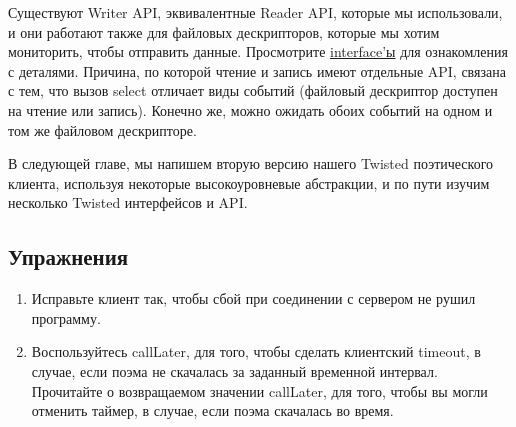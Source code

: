 Существуют Writer API, эквивалентные Reader API, которые 
мы использовали, и они работают также для файловых дескрипторов, 
которые мы хотим мониторить, чтобы отправить данные. Просмотрите  
\href{http://twistedmatrix.com/trac/browser/tags/releases/twisted-8.2.0/twisted/internet/interfaces.py}{interface'ы} 
для ознакомления с деталями. Причина, по которой чтение и запись 
имеют отдельные API, связана с тем, что вызов select 
отличает виды событий (файловый дескриптор доступен на 
чтение или запись). Конечно же, можно ожидать обоих событий 
на одном и том же файловом дескрипторе. 



В следующей главе, мы напишем вторую версию нашего Twisted 
поэтического клиента, используя некоторые высокоуровневые 
абстракции, и по пути изучим несколько Twisted интерфейсов и 
API. 


\subsection{Упражнения}

\begin{enumerate}

\item Исправьте клиент так, чтобы сбой при соединении с сервером не рушил программу.

\item Воспользуйтесь callLater, для того, чтобы сделать клиентский 
timeout, в случае, если поэма не скачалась за заданный временной 
интервал. Прочитайте о возвращаемом значении callLater, для того, 
чтобы вы могли отменить таймер, в случае, если поэма скачалась 
во время.

\end{enumerate}
